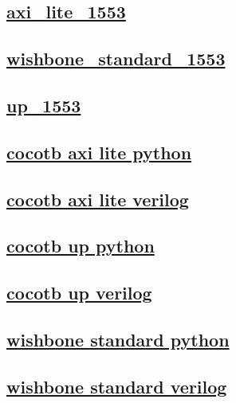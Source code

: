 \documentclass{article}
\begin{document}
  


  \subsection{\href{../files/axi_lite_1553-v.html}{axi\_lite\_1553}}

  \subsection{\href{../files/wishbone_standard_1553-v.html}{wishbone\_standard\_1553}}

  \subsection{\href{../files/up_1553-v.html}{up\_1553}}

  \subsection{\href{../files2/tb_cocotb_axi_lite-py.html}{cocotb axi lite python}}
  \subsection{\href{../files2/tb_cocotb_axi_lite-v.html}{cocotb axi lite verilog}}
  \subsection{\href{../files2/tb_cocotb_up-py.html}{cocotb up python}}
  \subsection{\href{../files2/tb_cocotb_up-v.html}{cocotb up verilog}}
  \subsection{\href{../files2/tb_cocotb_wishbone_standard-py.html}{wishbone standard python}}
  \subsection{\href{../files2/tb_cocotb_wishbone_standard-v.html}{wishbone standard verilog}}
\end{document}
